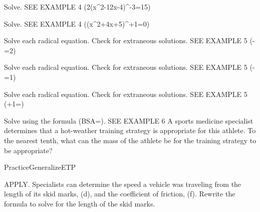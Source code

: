 \documentclass{article}
\newenvironment{practice}[2]{}{}        %
\newenvironment{te-addendum}[2]{}{}     %
\newcommand{\answer}[1]{}               %
\newcommand{\placeholder}[2]{}          %
\newcommand{\te}[1]{}                   %
\begin{document}
\begin{practice}{34}{1}
Solve. SEE EXAMPLE 4
(2(x^2-12x-4)^{}-3=15)
\answer{(x=-5) and (x=17)}
\end{practice}
\begin{practice}{35}{1}
Solve. SEE EXAMPLE 4
((x^2+4x+5)^{}+1=0)
\answer{There are no solutions.}
\end{practice}
\begin{practice}{36}{1}
Solve each radical equation. Check for extraneous solutions. SEE EXAMPLE 5
(-=2)
\answer{(x=8\frac1{16})}
\end{practice}
\begin{practice}{37}{1}
Solve each radical equation. Check for extraneous solutions. SEE EXAMPLE 5
(-=1)
\answer{(x=-1) and (x=-\frac59)}
\end{practice}
\begin{practice}{38}{1}
Solve each radical equation. Check for extraneous solutions. SEE EXAMPLE 5
(+1=)
\answer{(x=-\frac34)}
\end{practice}
\begin{practice}{39}{1}
Solve using the formula (BSA=). SEE EXAMPLE 6
A sports medicine specialist determines that a hot-weather training strategy is appropriate for this athlete. To the nearest tenth, what can the mass of the athlete be for the training strategy to be appropriate?
\placeholder{illustration}{Runner wearing race number 1789 and draped white jacket at finish line. Vertical double-ended dimension arrow from ground to top of head labeled 165 cm. Callout BSA <2.0.}
\answer{87.3 kg}
\te{Printed answer gives the rounded upper boundary without an inequality; the condition is (M<\frac{14,400}{165}) kg.}
\end{practice}
\begin{te-addendum}{Practice}{GeneralizeETP}
\te{Practice \& Problem Solving is available at SavvasRealize.com. Answers for 19--20 and 25 on this page are transcribed with their items.}
\end{te-addendum}
\begin{practice}{40}{2}
APPLY. Specialists can determine the speed a vehicle was traveling from the length of its skid marks, (d), and the coefficient of friction, (f). Rewrite the formula to solve for the length of the skid marks.
\placeholder{illustration}{Red car skids around curved roadway between orange cones, leaving two black skid marks. Callout: Vehicle's speed is (15.9\sqrt{df}).}
\answer{(d=\frac{s^2}{252.81f})}
\end{practice}
\end{document}
